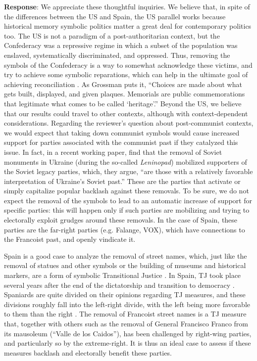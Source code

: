 \documentclass[12pt, a4paper, notitlepage]{article}
\begin{document}
\textbf{Response}: We appreciate these thoughtful inquiries. We believe that, in spite of the differences between the US and Spain, the US parallel works because historical memory symbolic politics matter a great deal for contemporary politics too. The US is not a paradigm of a post-authoritarian context, but the Confederacy was a repressive regime in which a subset of the population was enslaved, systematically discriminated, and oppressed. Thus, removing the symbols of the Confederacy is a way to somewhat acknowledge these victims, and try to achieve some symbolic reparations, which can help in the ultimate goal of achieving reconciliation \citep{Walsh2020, Ward2021}. As Grossman puts it, ``Choices are made about what gets built, displayed, and given plaques. Memorials are public commemorations that legitimate what comes to be called `heritage'.'' \citep{Grossman:2016}
Beyond the US, we believe that our results could travel to other contexts, although with context-dependent considerations. Regarding the reviewer's question about post-communist contexts, we would expect that taking down communist symbols would cause increased support for parties associated with the communist past if they catalyzed this issue. In fact, in a recent working paper, \citet{Rozenas:2021} find that the removal of Soviet monuments in Ukraine (during the so-called \textit{Leninopad}) mobilized supporters of the Soviet legacy parties, which, they argue, ``are those with a relatively favorable interpretation of Ukraine’s Soviet past.'' These are the parties that activate or simply capitalize popular backlash against these removals. To be sure, we do not expect the removal of the symbols to lead to an automatic increase of support for specific parties: this will happen only if such parties are mobilizing and trying to electorally exploit grudges around these removals. In the case of Spain, these parties are the far-right parties (e.g. Falange, VOX), which have connections to the Francoist past, and openly vindicate it.

Spain is a good case to analyze the removal of street names, which, just like the removal of statues and other symbols or the building of museums and historical markers, are a form of symbolic Transitional Justice \citep{Ward2021, Balcells:2020aa}. In Spain, TJ took place several years after the end of the dictatorship and transition to democracy \citep{Aguilar:2002aa}. Spaniards are quite divided on their opinions regarding TJ measures, and these divisions roughly fall into the left-right divide, with the left being more favorable to them than the right \citep{Aguilar:2011aa}. The removal of Francoist street names is a TJ measure that, together with others such as the removal of General Francisco Franco from its mausoleum (``Valle de los Caidos''), has been challenged by right-wing parties, and particularly so by the extreme-right. It is thus an ideal case to assess if these measures backlash and electorally benefit these parties.
\end{document}
